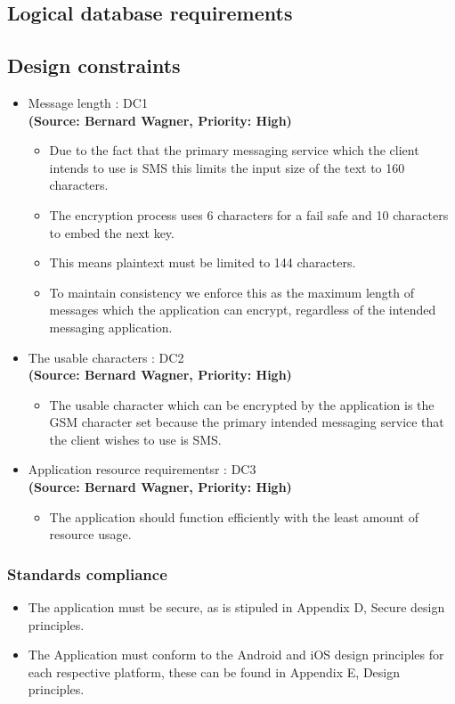\subsection{Logical database requirements}

\subsection{Design constraints}
\begin{itemize}
\item{Message length : DC1}\\
\textbf{(Source: Bernard Wagner, Priority: High)}
\begin{itemize}
\item Due to the fact that the primary messaging service which the client intends to use is SMS this limits the input size of the text to 160 characters. 
\item The encryption process uses 6 characters for a fail safe and 10 characters to embed the next key.
\item This means plaintext must be limited to 144 characters.
\item To maintain consistency we enforce this as the maximum length of messages which the application can encrypt, regardless of the intended messaging application.
\end{itemize}
\item{The usable characters : DC2}\\
\textbf{(Source: Bernard Wagner, Priority: High)}
\begin{itemize}
\item The usable character which can be encrypted by the application is the GSM character set because the primary intended messaging service that the client wishes to use is SMS. 
\end{itemize}
\item{Application resource requirementsr : DC3}\\
\textbf{(Source: Bernard Wagner, Priority: High)}
\begin{itemize}
\item The application should function efficiently with the least amount of resource usage.
\end{itemize}
\end{itemize}
\subsubsection{Standards compliance}
\begin{itemize}
\item The application must be secure, as is stipuled in Appendix D, Secure design principles.
\item The Application must conform to the Android and iOS design principles for each respective platform, these can be found in Appendix E, Design principles.
\end{itemize}

